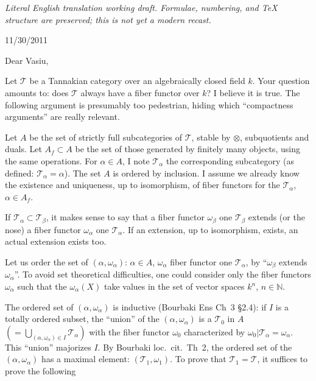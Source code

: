 \documentclass[11pt,a4paper]{article}
\theoremstyle{plain}
\theoremstyle{definition}
\begin{document}
\begin{center}\small\emph{Literal English translation working draft. Formulae, numbering, and TeX structure are preserved; this is not yet a modern recast.}\end{center}
\vspace{0.5em}


\begin{flushright}
11/30/2011
\end{flushright}

\medskip

Dear Vasiu,

\medskip

Let $\mathcal{T}$ be a Tannakian category over an algebraically closed field $k$.
Your question amounts to: does $\mathcal{T}$ always have a fiber functor over $k$?
I believe it is true. The following argument is presumably too pedestrian,
hiding which ``compactness arguments'' are really relevant.

Let $A$ be the set of strictly full subcategories of $\mathcal{T}$, stable by
$\otimes$, subquotients and duals. Let $A_f \subset A$ be the set of those
generated by finitely many objects, using the same operations. For $\alpha \in A$,
I note $\mathcal{T}_\alpha$ the corresponding subcategory (as defined:
$\mathcal{T}_\alpha = \alpha$). The set $A$ is ordered by inclusion. I assume
we already know the existence and uniqueness, up to isomorphism, of fiber
functors for the $\mathcal{T}_\alpha$, $\alpha \in A_f$.

If $\mathcal{T}_\alpha \subset \mathcal{T}_\beta$, it makes sense to say that
a fiber functor $\omega_\beta$ one $\mathcal{T}_\beta$ extends (or the nose) a
fiber functor $\omega_\alpha$ one $\mathcal{T}_\alpha$. If an extension, up to
isomorphism, exists, an actual extension exists too.

Let us order the set of $(\alpha, \omega_\alpha)$: $\alpha \in A$,
$\omega_\alpha$ fiber functor one $\mathcal{T}_\alpha$, by ``$\omega_\beta$
extends $\omega_\alpha$''. To avoid set theoretical difficulties, one could
consider only the fiber functors $\omega_\alpha$ such that the
$\omega_\alpha(X)$ take values in the set of vector spaces $k^n$, $n \in \mathbb{N}$.

The ordered set of $(\alpha, \omega_\alpha)$ is inductive (Bourbaki Ens Ch~3
\S2.4): if $I$ is a totally ordered subset, the ``union'' of the
$(\alpha, \omega_\alpha)$ is a $\mathcal{T}_0$ in $A$
$(= \bigcup_{(\alpha,\omega_\alpha) \in I} \mathcal{T}_\alpha)$ with the fiber
functor $\omega_0$ characterized by $\omega_0|\mathcal{T}_\alpha = \omega_\alpha$.
This ``union'' majorizes $I$. By Bourbaki loc.~cit.~Th~2, the ordered set of the
$(\alpha, \omega_\alpha)$ has a maximal element: $(\mathcal{T}_1, \omega_1)$.
To prove that $\mathcal{T}_1 = \mathcal{T}$, it suffices to prove the following
\end{document}
